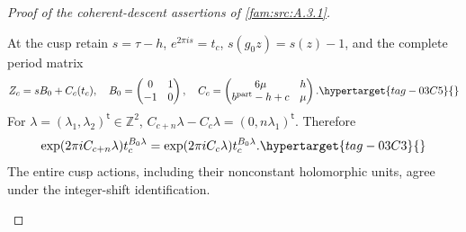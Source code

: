 \begin{proof}[Proof of the coherent-descent assertions of \cref{fam:src:A.3.1}]
\begin{enumerate}[label=\arabic*.,leftmargin=*]
At the cusp retain $s=\tau-h$, $e^{2\pi is}=t_c$, $s(g_0z)=s(z)-1$,
and the complete period matrix
\begin{equation}
 Z_c=sB_0+C_c(t_c),\quad
 B_0=\begin{pmatrix}0&1\\-1&0\end{pmatrix},\quad
 C_c=\begin{pmatrix}6\mu&h\\ b^{\mathrm{part}}-h+c&\mu\end{pmatrix}.
 \hypertarget{tag-03C5}{}\label{wb:pshift:eq:cusp-periods}
\end{equation}
For $\lambda=(\lambda_1,\lambda_2)^{\mathsf t}\in\mathbb Z^2$,
$C_{c+n}\lambda-C_c\lambda=(0,n\lambda_1)^{\mathsf t}$. Therefore
\begin{equation}
 \exp(2\pi iC_{c+n}\lambda)t_c^{B_0\lambda}
       =\exp(2\pi iC_c\lambda)t_c^{B_0\lambda}.
 \hypertarget{tag-03C3}{}\label{wb:pshift:eq:cusp-actions-identical}
\end{equation}
The entire cusp actions, including their nonconstant holomorphic units,
agree under the integer-shift identification.


\end{enumerate}
\end{proof}
